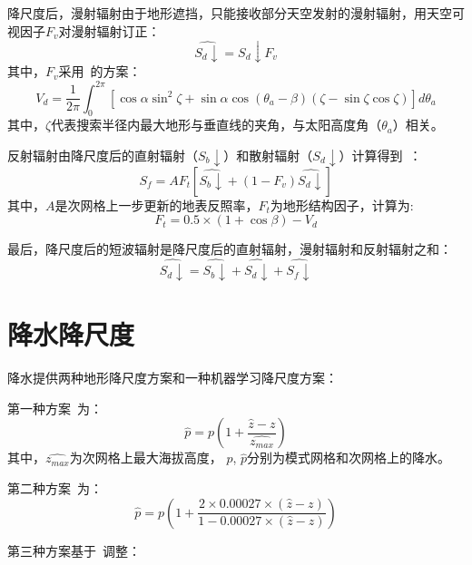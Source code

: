 降尺度后，漫射辐射由于地形遮挡，只能接收部分天空发射的漫射辐射，用天空可视因子$F_{v}$对漫射辐射订正：
\begin{equation}
\hat{S_{d}\downarrow}=S_{d}\downarrow F_{v}
\end{equation}
其中，$F_{v}$采用~\citep{dozier1990}的方案：
\begin{equation}
V_{d}=\frac{1}{2\pi} \int_{0}^{2\pi} [\cos{\alpha}\sin^2{\zeta}+\sin{\alpha}\cos{\left(\theta_{a}-\beta\right)}\left(\zeta-\sin{\zeta}\cos{\zeta}\right)]d\theta_{a}
\end{equation}
其中，$\zeta$代表搜索半径内最大地形与垂直线的夹角，与太阳高度角（$\theta_{a}$）相关。

反射辐射由降尺度后的直射辐射（$S_{b}\downarrow$）和散射辐射（$S_{d}\downarrow$）计算得到~\citep{tao2018}：
\begin{equation}
S_{f}=A F_{t} [\hat{S_{b}\downarrow}+\left(1-F_{v}\right)\hat{S_{d}\downarrow}]
\end{equation}
其中，$A$是次网格上一步更新的地表反照率，$F_{t}$为地形结构因子，计算为:
\begin{equation}
F_{t}=0.5 \times \left(1+\cos{\beta}\right)-V_{d}
\end{equation}

最后，降尺度后的短波辐射是降尺度后的直射辐射，漫射辐射和反射辐射之和：
\begin{equation}
\hat{S_{d}\downarrow}=\hat{S_{b}\downarrow}+\hat{S_{d}\downarrow}+\hat{S_{f}\downarrow}
\end{equation}

\section{降水降尺度}
降水提供两种地形降尺度方案和一种机器学习降尺度方案：

第一种方案~\citep{Tesfa2020}为：
\begin{equation}
\hat{p}=p \left({1+\frac{\hat{z}-z}{\hat{z_{max}}}}\right)
\end{equation}
其中，$\hat{z_{max}}$为次网格上最大海拔高度，
$p$, $\hat{p}$分别为模式网格和次网格上的降水。

第二种方案~\citep{liston2006Meteorological}为：
\begin{equation}
\hat{p}=p \left(1+\frac{2 \times 0.00027 \times \left(\hat{z}-z\right)}{1- 0.00027 \times \left(\hat{z}-z\right)}\right)
\end{equation}

第三种方案基于~\citep{mei2020}调整：

